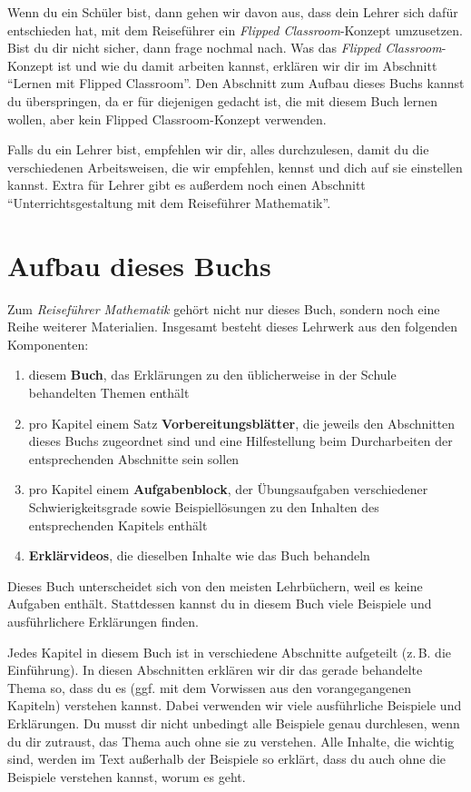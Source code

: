 \documentclass[../main.tex]{subfiles}
\begin{document}
Wenn du ein Schüler bist, dann gehen wir davon aus, dass dein Lehrer sich dafür entschieden hat, mit dem Reiseführer ein \emph{Flipped Classroom}-Konzept umzusetzen. Bist du dir nicht sicher, dann frage nochmal nach. Was das \emph{Flipped Classroom}-Konzept ist und wie du damit arbeiten kannst, erklären wir dir im Abschnitt \enquote{Lernen mit Flipped Classroom}. Den Abschnitt zum Aufbau dieses Buchs kannst du überspringen, da er für diejenigen gedacht ist, die mit diesem Buch lernen wollen, aber kein Flipped Classroom-Konzept verwenden.

Falls du ein Lehrer bist, empfehlen wir dir, alles durchzulesen, damit du die verschiedenen Arbeitsweisen, die wir empfehlen, kennst und dich auf sie einstellen kannst. Extra für Lehrer gibt es außerdem noch einen Abschnitt \enquote{Unterrichtsgestaltung mit dem Reiseführer Mathematik}.

\newpage
\section*{Aufbau dieses Buchs}
\label{concept}

Zum \emph{Reiseführer Mathematik} gehört nicht nur dieses Buch, sondern noch eine Reihe weiterer Materialien. Insgesamt besteht dieses Lehrwerk aus den folgenden Komponenten:
\begin{enumerate}
    \item[\tikzball{blue!40}{1}] diesem \textbf{Buch}, das Erklärungen zu den üblicherweise in der Schule behandelten Themen enthält
    \item[\tikzball{blue!40}{2}] pro Kapitel einem Satz \textbf{Vorbereitungsblätter}, die jeweils den Abschnitten dieses Buchs zugeordnet sind und eine Hilfestellung beim Durcharbeiten der entsprechenden Abschnitte sein sollen
    \item[\tikzball{blue!40}{3}] pro Kapitel einem \textbf{Aufgabenblock}, der Übungsaufgaben verschiedener Schwierigkeitsgrade sowie Beispiellösungen zu den Inhalten des entsprechenden Kapitels enthält
    \item[\tikzball{blue!40}{4}] \textbf{Erklärvideos}, die dieselben Inhalte wie das Buch behandeln
\end{enumerate}

Dieses Buch unterscheidet sich von den meisten Lehrbüchern, weil es keine Aufgaben enthält. Stattdessen kannst du in diesem Buch viele Beispiele und ausführlichere Erklärungen finden.

Jedes Kapitel in diesem Buch ist in verschiedene Abschnitte aufgeteilt (z.\,B. die Einführung). In diesen Abschnitten erklären wir dir das gerade behandelte Thema so, dass du es (ggf. mit dem Vorwissen aus den vorangegangenen Kapiteln) verstehen kannst. Dabei verwenden wir viele ausführliche Beispiele und Erklärungen. Du musst dir nicht unbedingt alle Beispiele genau durchlesen, wenn du dir zutraust, das Thema auch ohne sie zu verstehen. Alle Inhalte, die wichtig sind, werden im Text außerhalb der Beispiele so erklärt, dass du auch ohne die Beispiele verstehen kannst, worum es geht. 
\end{document}
